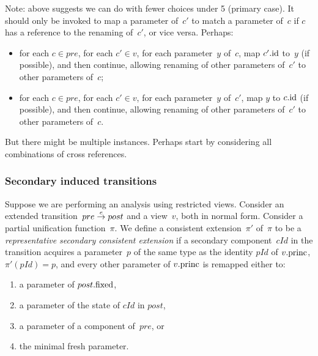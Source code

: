 Note: above suggests we can do with fewer choices under 5 (primary case).  It
should only be invoked to map a parameter of~$c'$ to match a parameter of~$c$
if $c$ has a reference to the renaming of~$c'$, or vice versa.  Perhaps:
\begin{itemize}
\item for each $c \in pre$, for each $c' \in v$, for each parameter~$y$ of~$c$,
  map $c'.\mathrm{id}$ to~$y$ (if possible), and then continue, allowing renaming of
  other parameters of~$c'$ to other parameters of~$c$;

\item for each $c \in pre$, for each $c' \in v$, for each parameter~$y$
  of~$c'$, map $y$ to $c.\mathrm{id}$ (if possible), and then continue, allowing
  renaming of other parameters of~$c'$ to other parameters of~$c$.
\end{itemize}
%
But there might be multiple instances.  Perhaps start by considering all
combinations of cross references. 


\subsubsection{Secondary induced transitions}


\begin{definition} 
\label{def:representative-consistent-extension-singleRef-secondary}
Suppose we are performing an analysis using restricted views.  Consider an
extended transition~$pre \stackrel{e}\rightarrow post$ and a view~$v$, both in normal form.
Consider a partial unification function~$\pi$.
%
%
We define a consistent extension~$\pi'$ of~$\pi$ to be a \emph{representative
  secondary consistent extension} if a secondary component~$cId$ in the
transition acquires a parameter~$p$ of the same type as the identity $pId$ of
$v.\mathrm{princ}$, $\pi'(pId) = p$, and every other parameter of $v.\mathrm{princ}$ is
remapped either to:
\begin{enumerate}
\item \label{item:effectOn-secondary-1} a parameter of $post.\mathrm{fixed}$,

\item\label{item:effectOn-secondary-2} a parameter of the
state of $cId$ in $post$, 

\item\label{item:effectOn-secondary-3} a parameter of a component of~$pre$, or

\item\label{item:effectOn-secondary-4} the minimal fresh parameter.
\end{enumerate}
\end{definition}

